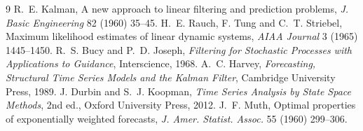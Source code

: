 \documentclass[11pt,a4paper]{article}
\begin{document}
\begin{thebibliography}{9}
 R.~E. Kalman, A new approach to linear filtering and prediction problems,
  \emph{J. Basic Engineering} 82 (1960) 35--45.
 H.~E. Rauch, F. Tung and C.~T. Striebel, Maximum likelihood estimates of linear dynamic systems,
  \emph{AIAA Journal} 3 (1965) 1445--1450.
 R.~S. Bucy and P.~D. Joseph, \emph{Filtering for Stochastic Processes with Applications to Guidance},
  Interscience, 1968.
 A.~C. Harvey, \emph{Forecasting, Structural Time Series Models and the Kalman Filter},
  Cambridge University Press, 1989.
 J. Durbin and S.~J. Koopman, \emph{Time Series Analysis by State Space Methods}, 2nd ed.,
  Oxford University Press, 2012.
 J.~F. Muth, Optimal properties of exponentially weighted forecasts,
  \emph{J. Amer. Statist. Assoc.} 55 (1960) 299--306.
\end{thebibliography}
\end{document}
